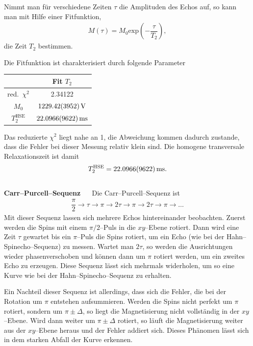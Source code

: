 \documentclass[10pt]{article}
\newenvironment{Figure}
  {\par\medskip\noindent\minipage{\linewidth}}
  {\endminipage\par\medskip}
\begin{document}
\begin{multicols}{2}
Nimmt man für verschiedene Zeiten $\tau $ die Amplituden des Echos auf, so kann man mit Hilfe einer Fitfunktion,
\begin{align} 
        M\left(\tau \right)=M_0\text{exp}\left(-\dfrac{\tau }{T_2}\right)
,\end{align} 
die Zeit $T_2$ bestimmen.
  \begin{Figure}
    \centering\resizebox{\textwidth}{!}{}
    \label{fig:T2eff}
  \end{Figure}
Die Fitfunktion ist charakterisiert durch folgende Parameter
  \begin{center}
    \begin{tabular}{c|c}
    & Fit $T_2$\\
    \hline
    red.\ $\chi ^2$ & 2.34122 \\
    $M_0$ & $\SI{1229.42+-39.52}{V}$ \\
    $T_2^{\text{HSE}}$ & $\SI{22.0966+-0.9622}{ms}$ 
    \end{tabular}
  \label{Tab:echo_para}
  \end{center}
Das reduzierte $\chi ^2$ liegt nahe an 1, die Abweichung kommen dadurch zustande, dass die Fehler bei dieser Messung relativ klein sind.
Die homogene transversale Relaxationszeit ist damit
\begin{align} 
        T_2^{\text{HSE}}=\SI{22.0966+-0.9622}{ms}
.\end{align} 
\\
\textbf{Carr--Purcell--Sequenz} $\quad$ 
Die Carr--Purcell--Sequenz ist
\begin{align} 
        \dfrac{\pi }{2}\rightarrow \tau \rightarrow \pi \rightarrow 2\tau \rightarrow \pi \rightarrow 2\tau \rightarrow \pi \rightarrow \hdots 
\end{align} 
Mit dieser Sequenz lassen sich mehrere Echos hintereinander beobachten.
Zuerst werden die Spins mit einem $\pi /2$--Puls in die $xy$--Ebene rotiert.
Dann wird eine Zeit $\tau $ gewartet bis ein $\pi $--Puls die Spins rotiert, um ein Echo (wie bei der Hahn--Spinecho--Sequenz) zu messen.
Wartet man $2\tau $, so werden die Ausrichtungen wieder phasenverschoben und können dann um $\pi $ rotiert werden, um ein zweites Echo zu erzeugen.
Diese Sequenz lässt sich mehrmals widerholen, um so eine Kurve wie bei der Hahn--Spinecho--Sequenz zu erhalten.

Ein Nachteil dieser Sequenz ist allerdings, dass sich die Fehler, die bei der Rotation um $\pi $ entstehen aufsummieren.
Werden die Spins nicht perfekt um $\pi $ rotiert, sondern um $\pi \pm \Delta $, so liegt die Magnetisierung nicht vollständig in der $xy$--Ebene.
Wird dann weiter um $\pi \pm \Delta $ rotiert, so läuft die Magnetisierung weiter aus der $xy$--Ebene heraus und der Fehler addiert sich.
Dieses Phänomen lässt sich in dem starken Abfall der Kurve erkennen.


\end{multicols}
\end{document}
